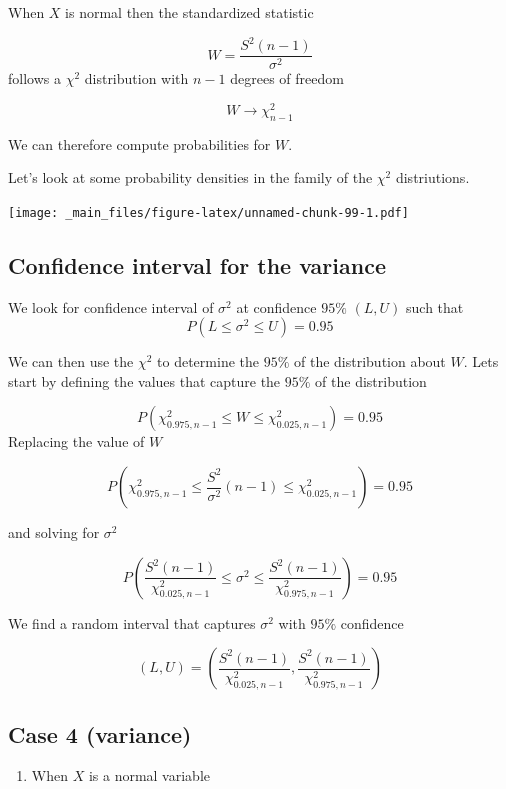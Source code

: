 \documentclass[
]{book}
\providecommand{\tightlist}{%
  \setlength{\itemsep}{0pt}\setlength{\parskip}{0pt}}
\begin{document}
When \(X\) is normal then the standardized statistic

\[W=\frac{S^2(n-1)}{\sigma^2}\]
follows a \(\chi^2\) distribution with \(n-1\) degrees of freedom

\[W \rightarrow \chi^2_{n-1}\]

We can therefore compute probabilities for \(W\).

Let's look at some probability densities in the family of the \(\chi^2\) distriutions.

\texttt{[image: \_main\_files/figure-latex/unnamed-chunk-99-1.pdf]}

\hypertarget{confidence-interval-for-the-variance-1}{%
\subsection{Confidence interval for the variance}\label{confidence-interval-for-the-variance-1}}

We look for confidence interval of \(\sigma^2\) at confidence \(95\%\) \((L,U)\) such that \[P(L \leq \sigma^2 \leq U)=0.95\]

We can then use the \(\chi^2\) to determine the \(95\%\) of the distribution about \(W\). Lets start by defining the values that capture the \(95\%\) of the distribution

\[P(\chi^2_{0.975,n-1} \leq W \leq \chi^2_{0.025,n-1})=0.95\]
Replacing the value of \(W\)

\[P(\chi^2_{0.975,n-1} \leq \frac{S^2}{\sigma^2}(n-1) \leq \chi^2_{0.025,n-1})=0.95\]

and solving for \(\sigma^2\)

\[P(\frac{S^2 (n-1)}{\chi^2_{0.025,n-1}}\leq \sigma^2 \leq \frac{S^2(n-1)}{\chi^2_{0.975,n-1}})=0.95\]

We find a random interval that captures \(\sigma^2\)
with \(95\%\) confidence

\[(L,U) = (\frac{S^2 (n-1)}{\chi^2_{0.025,n-1}},\frac{S^2(n-1)}{\chi^2_{0.975,n-1}})\]

\hypertarget{case-4-variance}{%
\subsection{Case 4 (variance)}\label{case-4-variance}}

\begin{enumerate}
\def\labelenumi{\arabic{enumi}.}
\tightlist
\item
  When \(X\) is a normal variable
\end{enumerate}
\end{document}
